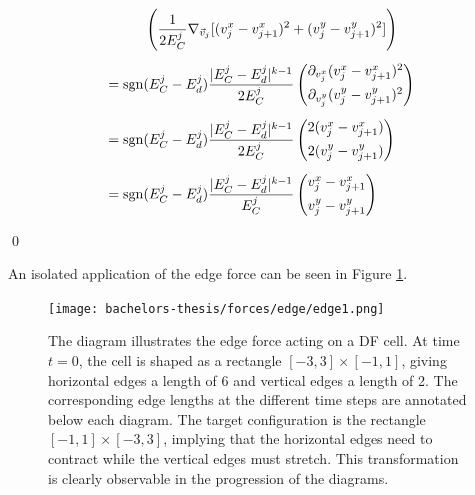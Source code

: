 \begin{proposition}
\begin{align*}
		& \hspace{1cm} \left(\frac{1}{2 E^{j}_C} \nabla_{\vec{v}_j} [(v_{j}^{x} - v_{j+1}^{x})^2 + (v_{j}^{y} - v_{j+1}^{y})^2]\right) \\[0.5em] 
		&= \operatorname{sgn}(E^{j}_C - E^{j}_d) \frac{|E^{j}_C - E^{j}_d|^{k-1}}{2 E^{j}_C} \begin{pmatrix}
			\partial_{v_{j}^{x}} (v_{j}^{x} - v_{j+1}^{x})^2 \\[0.5em]
			\partial_{v_{j}^{y}} (v_{j}^{y} - v_{j+1}^{y})^2
		\end{pmatrix} \\[0.5em]
		&= \operatorname{sgn}(E^{j}_C - E^{j}_d) \frac{|E^{j}_C - E^{j}_d|^{k-1}}{2 E^{j}_C} \begin{pmatrix}
			2(v_{j}^{x} - v_{j+1}^{x}) \\[0.5em]
			2(v_{j}^{y} - v_{j+1}^{y})
		\end{pmatrix} \\[0.5em]
		&= \operatorname{sgn}(E^{j}_C - E^{j}_d) \frac{ |E^{j}_C - E^{j}_d|^{k-1}}{E^{j}_C} \begin{pmatrix}
				v_{j}^{x} - v_{j+1}^{x} \\[0.5em]
				v_{j}^{y} - v_{j+1}^{y}
		\end{pmatrix}
	\end{align*}
	
	

	\qed  
\end{proposition}

An isolated application of the edge force can be seen in Figure \ref{fig:edgeForce}.  

\begin{figure}
	\begin{center}
		\texttt{[image: bachelors-thesis/forces/edge/edge1.png]}
		\caption{The diagram illustrates the edge force acting on a DF cell.
		At time $t=0$, the cell is shaped as a rectangle $[-3,3]\times [-1,1]$, giving horizontal edges a length of 6 and vertical edges a length of 2.
		The corresponding edge lengths at the different time steps are annotated below each diagram.
		The target configuration is the rectangle $[-1,1]\times [-3,3]$, implying that the horizontal edges need to contract while the vertical edges must stretch.
		This transformation is clearly observable in the progression of the diagrams.
		}
		\label{fig:edgeForce}
	\end{center}
\end{figure}


